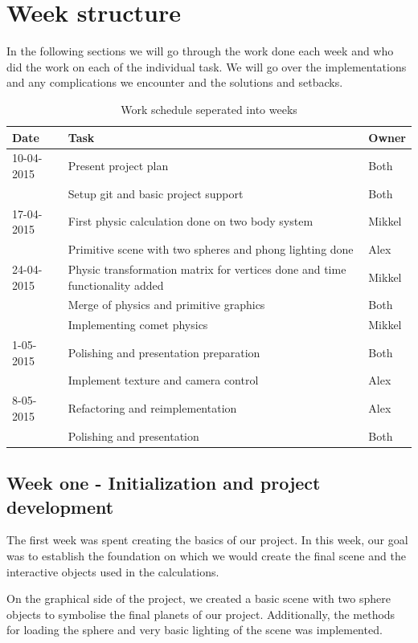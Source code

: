 \section{Week structure}
In the following sections we will go through the work done each week and who did the work on each of the individual task. We will go over the implementations and any complications we encounter and the solutions and setbacks. 

\begin{table}[h]
\begin{tabular}{|l|l|l|}
\hline
Date & Task & Owner\\
\hline
10-04-2015 & Present project plan & Both\\
 & Setup git and basic project support & Both\\
\hline
17-04-2015 & First physic calculation done on two body system & Mikkel\\
 & Primitive scene with two spheres and phong lighting done & Alex\\
\hline
24-04-2015 & Physic transformation matrix for vertices done and time functionality added &	Mikkel\\
 & Merge of physics and primitive graphics & Both\\
 & Implementing comet physics & Mikkel\\
\hline
1-05-2015 & Polishing and presentation preparation & Both\\
 & Implement texture and camera control & Alex\\	
\hline
8-05-2015 & Refactoring and reimplementation & Alex\\
 & Polishing and presentation & Both\\
\hline
\end{tabular}
\caption{Work schedule seperated into weeks}
\label{tabWeek}
\end{table}

\subsection{Week one - Initialization and project development}
The first week was spent creating the basics of our project. In this week, our goal was to establish the foundation on which we would create the final scene and the interactive objects used in the calculations.

On the graphical side of the project, we created a basic scene with two sphere objects to symbolise the final planets of our project. Additionally, the methods for loading the sphere and very basic lighting of the scene was implemented.\\

